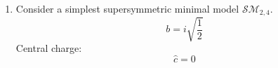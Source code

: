 \documentclass[12pt]{article}
\theoremstyle{definition}
\begin{document}
\begin{enumerate}
    \item Consider a simplest supersymmetric minimal model $\mathcal{SM}_{2,4}$.
    \begin{equation}
        b=i\sqrt{\frac{1}{2}}
    \end{equation}
    Central charge:
    \begin{equation}
        \hat{c}=0
    \end{equation}
    
\end{enumerate}

\end{document}
